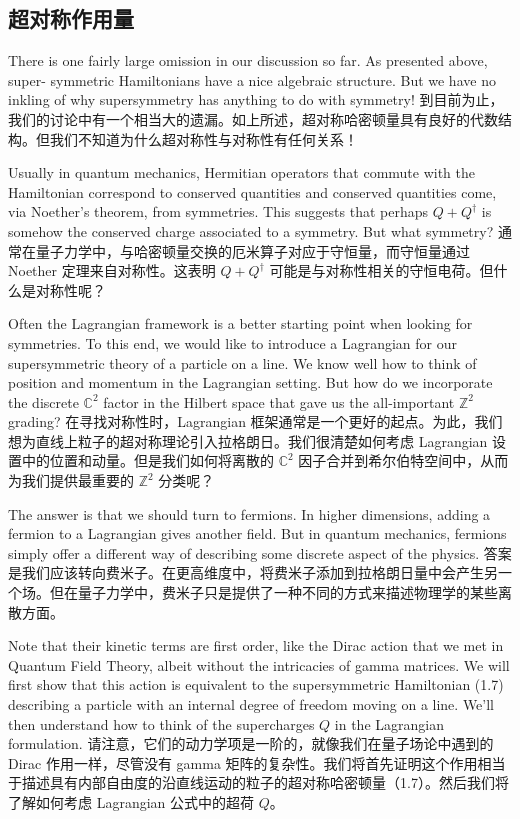 \documentclass{ctexart}
\begin{document}
\begin{paracol}{2}
\subsection*{超对称作用量}
\switchcolumn*

There is one fairly large omission in our discussion so far. As presented above, super- symmetric Hamiltonians have a nice algebraic structure. But we have no inkling of why supersymmetry has anything to do with symmetry!
\switchcolumn
到目前为止，我们的讨论中有一个相当大的遗漏。如上所述，超对称哈密顿量具有良好的代数结构。但我们不知道为什么超对称性与对称性有任何关系！
\switchcolumn*

Usually in quantum mechanics, Hermitian operators that commute with the Hamiltonian correspond to conserved quantities and conserved quantities come, via Noether's theorem, from symmetries. This suggests that perhaps $Q + Q^{\dagger}$ is somehow the conserved charge associated to a symmetry. But what symmetry?
\switchcolumn
通常在量子力学中，与哈密顿量交换的厄米算子对应于守恒量，而守恒量通过 Noether 定理来自对称性。这表明 $Q + Q^{\dagger}$ 可能是与对称性相关的守恒电荷。但什么是对称性呢？
\switchcolumn*

Often the Lagrangian framework is a better starting point when looking for symmetries. To this end, we would like to introduce a Lagrangian for our supersymmetric theory of a particle on a line. We know well how to think of position and momentum in the Lagrangian setting. But how do we incorporate the discrete $\mathbb{C}^2$ factor in the Hilbert space that gave us the all-important $\mathbb{Z}^2$ grading?
\switchcolumn
在寻找对称性时，Lagrangian 框架通常是一个更好的起点。为此，我们想为直线上粒子的超对称理论引入拉格朗日。我们很清楚如何考虑 Lagrangian 设置中的位置和动量。但是我们如何将离散的 $\mathbb{C}^2$ 因子合并到希尔伯特空间中，从而为我们提供最重要的 $\mathbb{Z}^2$ 分类呢？
\switchcolumn*

The answer is that we should turn to fermions. In higher dimensions, adding a fermion to a Lagrangian gives another field. But in quantum mechanics, fermions simply offer a different way of describing some discrete aspect of the physics.
\switchcolumn
答案是我们应该转向费米子。在更高维度中，将费米子添加到拉格朗日量中会产生另一个场。但在量子力学中，费米子只是提供了一种不同的方式来描述物理学的某些离散方面。
\switchcolumn*

Note that their kinetic terms are first order, like the Dirac action that we met in Quantum Field Theory, albeit without the intricacies of gamma matrices. We will first show that this action is equivalent to the supersymmetric Hamiltonian (1.7) describing a particle with an internal degree of freedom moving on a line. We'll then understand how to think of the supercharges $Q$ in the Lagrangian formulation.
\switchcolumn
请注意，它们的动力学项是一阶的，就像我们在量子场论中遇到的 Dirac 作用一样，尽管没有 gamma 矩阵的复杂性。我们将首先证明这个作用相当于描述具有内部自由度的沿直线运动的粒子的超对称哈密顿量（1.7）。然后我们将了解如何考虑 Lagrangian 公式中的超荷 $Q$。
\switchcolumn*


\end{paracol}
\end{document}
